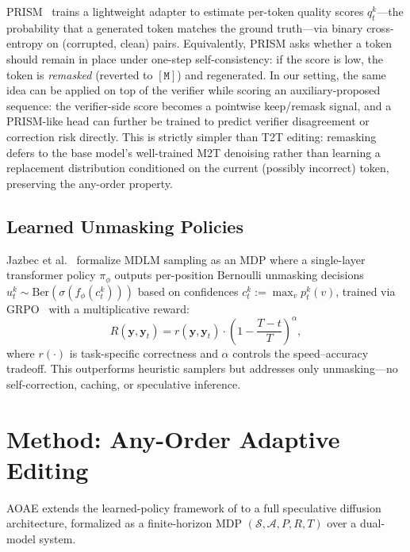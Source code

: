 \documentclass[11pt]{article}
\newcommand{\cS}{\mathcal{S}}
\newcommand{\cA}{\mathcal{A}}
\newcommand{\by}{\mathbf{y}}
\newcommand{\mask}{\ensuremath{\mathtt{[M]}}}
\begin{document}
PRISM~\cite{kim2025prism} trains a lightweight adapter to estimate per-token quality scores $q_t^k$---the probability that a generated token matches the ground truth---via binary cross-entropy on (corrupted, clean) pairs.
Equivalently, PRISM asks whether a token should remain in place under one-step self-consistency: if the score is low, the token is \emph{remasked} (reverted to $\mask$) and regenerated.
In our setting, the same idea can be applied on top of the verifier while scoring an auxiliary-proposed sequence: the verifier-side score becomes a pointwise keep/remask signal, and a PRISM-like head can further be trained to predict verifier disagreement or correction risk directly.
This is strictly simpler than T2T editing: remasking defers to the base model's well-trained M2T denoising rather than learning a replacement distribution conditioned on the current (possibly incorrect) token, preserving the any-order property.

\subsection{Learned Unmasking Policies}
\label{sec:bg_rl}

Jazbec et al.~\cite{jazbec2025learning} formalize MDLM sampling as an MDP where a single-layer transformer policy $\pi_\phi$ outputs per-position Bernoulli unmasking decisions $u_t^k \sim \text{Ber}(\sigma(f_\phi(c_t^k)))$ based on confidences $c_t^k := \max_v p_t^k(v)$, trained via GRPO~\cite{shao2024deepseekmath} with a multiplicative reward:
\begin{equation}
    R(\by, \by_t) = r(\by, \by_t) \cdot \left(1 - \frac{T - t}{T}\right)^\alpha,
    \label{eq:rl_reward}
\end{equation}
where $r(\cdot)$ is task-specific correctness and $\alpha$ controls the speed--accuracy tradeoff.
This outperforms heuristic samplers but addresses only unmasking---no self-correction, caching, or speculative inference.

\section{Method: Any-Order Adaptive Editing}
\label{sec:method}

AOAE extends the learned-policy framework of  to a full speculative diffusion architecture, formalized as a finite-horizon MDP $(\cS, \cA, P, R, T)$ over a dual-model system.
\end{document}
